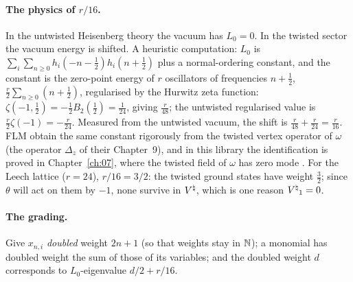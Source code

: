 \paragraph{The physics of $r/16$.}  In the untwisted Heisenberg theory the vacuum has
$L_0=0$.  In the twisted sector the vacuum energy is shifted.  A heuristic computation: $L_0$ is
$\sum_i\sum_{n\ge0}h_i(-n-\frac12)h_i(n+\frac12)$ plus a normal-ordering constant, and the
constant is the zero-point energy of $r$ oscillators of frequencies $n+\frac12$,
$\frac r2\sum_{n\ge 0}(n+\frac12)$, regularised by the Hurwitz zeta function:
$\zeta(-1,\tfrac12)=-\tfrac12B_2(\tfrac12)=\tfrac1{24}$, giving $\frac r{48}$; the untwisted
regularised value is $\frac r2\zeta(-1)=-\frac r{24}$.  Measured from the untwisted vacuum, the
shift is $\frac r{48}+\frac r{24}=\frac r{16}$.  FLM obtain the same constant rigorously from the
twisted vertex operator of $\omega$ (the operator $\Delta_z$ of their Chapter~9), and in this
library the identification is proved in Chapter~\ref{ch:07}, where the twisted field of $\omega$
has zero mode .  For the Leech lattice ($r=24$), $r/16=3/2$: the twisted ground states
have weight $\frac32$; since $\theta$ will act on them by $-1$, none survive in ${V^{\natural}}$, which is
one reason ${V^{\natural}}_1=0$.

\paragraph{The grading.}  Give $x_{n,i}$ \emph{doubled} weight $2n+1$ (so that weights stay in
${\mathbb{N}}$); a monomial has doubled weight the sum of those of its variables; and the doubled weight $d$
corresponds to $L_0$-eigenvalue $d/2+r/16$.

